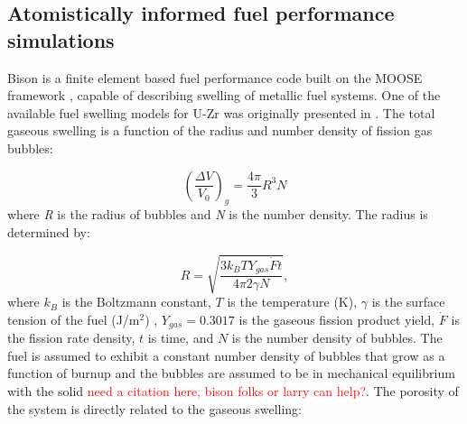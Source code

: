 \documentclass[review]{elsarticle}
\begin{document}

\FloatBarrier

\subsection{Atomistically informed fuel performance simulations}

Bison is a finite element based fuel performance code built on the MOOSE framework \cite{tonks2017}, capable of describing swelling of metallic fuel systems. One of the available fuel swelling models for U-Zr was originally presented in \cite{olander76}. The total gaseous swelling is a function of the radius and number density of fission gas bubbles:

\begin{equation}
  \left(\frac{\Delta V}{V_0}\right)_{g}=\frac{4\pi}{3}R^3 N
  \label{eq:swelling}
\end{equation} where \textit{R} is the radius of bubbles and \textit{N} is the number density. The radius is determined by:

\begin{equation}
  \label{bubble_radius}
  R = \sqrt{\frac{3 k_B T Y_{gas} \dot{F} t}{4 \pi 2 \gamma N}},
\end{equation} where $k_B$ is the Boltzmann constant, $T$ is the temperature (K), $\gamma$ is the surface tension of the fuel (J/m$^2$) \cite{karahan2009}, $Y_{gas}=0.3017$ is the gaseous fission product yield, $\dot{F}$ is the fission rate density, $t$ is time, and $N$ is the number density of bubbles. The fuel is assumed to exhibit a constant number density of bubbles that grow as a function of burnup and the bubbles are assumed to be in mechanical equilibrium with the solid \cite{LLS_report} \textcolor{red}{need a citation here, bison folks or larry can help?}. The porosity of the system is directly related to the gaseous swelling: 
\end{document}
